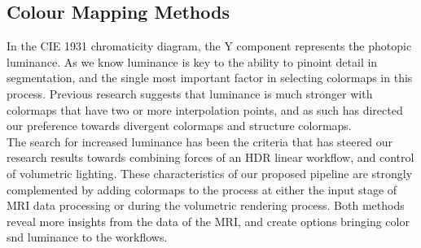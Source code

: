 \subsection{Colour Mapping Methods}
In the CIE 1931 chromaticity diagram, the Y component represents the photopic luminance.  As we know luminance is key to the ability to pinoint detail in segmentation, and the single most important factor in selecting colormaps in this process.  Previous research suggests that luminance is much stronger with colormaps that have two or more interpolation points, and as such has directed our preference towards divergent colormaps and structure colormaps.\\

The search for increased luminance has been the criteria that has steered our research results towards combining forces of an HDR linear workflow, and control of volumetric lighting.  These characteristics of our proposed pipeline are strongly complemented by adding colormaps to the process at either the input stage of MRI data processing or during the volumetric rendering process.  Both methods reveal more insights from the data of the MRI, and create options bringing color snd luminance to the workflows.